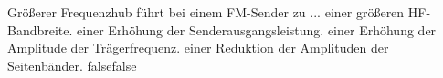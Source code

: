     {Größerer Frequenzhub führt bei einem FM-Sender zu ...}
    {einer größeren HF-Bandbreite.}
    {einer Erhöhung der Senderausgangsleistung.}
    {einer Erhöhung der Amplitude der Trägerfrequenz.}
    {einer Reduktion der Amplituden der Seitenbänder.}
    {false}{false}